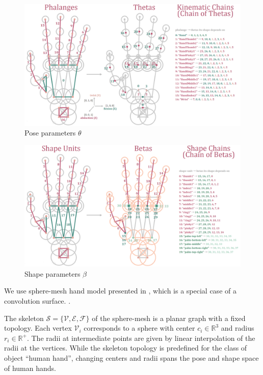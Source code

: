 \documentclass[10pt,twocolumn,letterpaper]{article}
\begin{document}
\begin{figure}[h!]
\centering
\includegraphics[width=1\linewidth]{figures/thetas}
\caption{Pose parameters $\theta$}
\label{fig:thetas}
\end{figure}

\begin{figure}[h!]
\centering
\includegraphics[width=1\linewidth]{figures/betas}
\caption{Shape parameters $\beta$}
\label{fig:betas}
\end{figure}

We use sphere-mesh hand model presented in \cite{tkach2016sphere}, which is a special case of a convolution surface. \textbf{\color{accent}{Maybe briefly recap advantages of sphere-meshes hand model representation}}. 

The skeleton $\mathcal{S} = \{\mathcal{V}, \mathcal{E}, \mathcal{F}\}$ of the sphere-mesh is a planar graph with a fixed topology. Each vertex $\mathcal{V}_i$ corresponds to a sphere with center $c_i \in \mathbb{R}^3$ and radius $r_i \in \mathbb{R}^+$. The radii at intermediate points are given by linear interpolation of the radii at the vertices.
While the skeleton topology is predefined for the class of object ``human hand'', changing centers and radii spans the pose and shape space of human hands.
\end{document}
